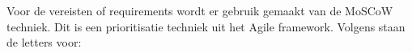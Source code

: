%



%



% 



% 






%



%
Voor de vereisten of requirements wordt er gebruik gemaakt van de MoSCoW techniek. Dit is een prioritisatie techniek uit het Agile framework. Volgens \textcite{2025agile} staan de letters voor:

